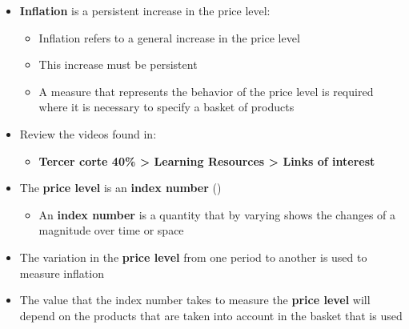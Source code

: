 \documentclass[
  ignorenonframetext,
]{beamer}
\providecommand{\tightlist}{%
  \setlength{\itemsep}{0pt}\setlength{\parskip}{0pt}}\usepackage{longtable,booktabs,array}
\begin{document}
\begin{frame}{}
\label{section-4}
\begin{itemize}
\item
  \textbf{Inflation} is a persistent increase in the price level:

  \begin{itemize}
  \item
    Inflation refers to a general increase in the price level
  \item
    This increase must be persistent
  \item
    A measure that represents the behavior of the price level is
    required where it is necessary to specify a basket of products
  \end{itemize}
\item
  Review the videos found in:

  \begin{itemize}
  \tightlist
  \item
    \textbf{Tercer corte 40\% \textgreater{} Learning Resources
    \textgreater{} Links of interest}
  \end{itemize}
\end{itemize}
\end{frame}

\begin{frame}{}
\label{section-5}
\begin{itemize}
\item
  The \textbf{price level} is an \textbf{index number}
  ()

  \begin{itemize}
  \tightlist
  \item
    An \textbf{index number} is a quantity that by varying shows the
    changes of a magnitude over time or space
  \end{itemize}
\item
  The variation in the \textbf{price level} from one period to another
  is used to measure inflation
\item
  The value that the index number takes to measure the \textbf{price
  level} will depend on the products that are taken into account in the
  basket that is used
\end{itemize}
\end{frame}
\end{document}
